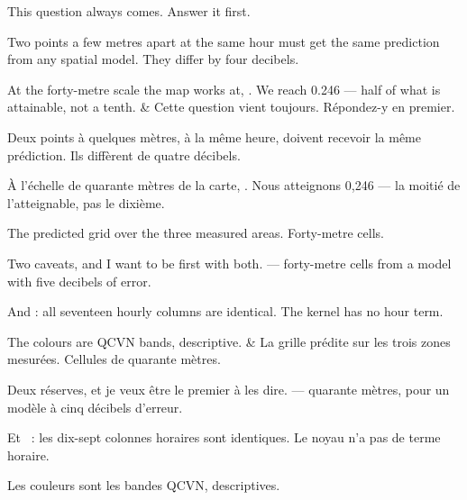 \documentclass[10pt,a4paper]{article}
\begin{document}
\begin{say}
This question always comes. Answer it first.

Two points a few metres apart at the same hour must get the same prediction from
any spatial model.  They differ by four decibels.

At the forty-metre scale the map works at, . We
reach 0.246 --- half of what is attainable, not a tenth.
&
Cette question vient toujours. Répondez-y en premier.

Deux points à quelques mètres, à la même heure, doivent recevoir la même
prédiction.  Ils diffèrent de quatre décibels.

À l'échelle de quarante mètres de la carte, .
Nous atteignons 0,246 --- la moitié de l'atteignable, pas le dixième.
\end{say}

\begin{say}
The predicted grid over the three measured areas. Forty-metre cells.

Two caveats, and I want to be first with both.  --- forty-metre cells from a model with five decibels of error.

And : all seventeen hourly columns are identical. The
kernel has no hour term.

The colours are QCVN bands, descriptive. 
&
La grille prédite sur les trois zones mesurées. Cellules de quarante mètres.

Deux réserves, et je veux être le premier à les dire.  --- quarante mètres, pour un modèle à cinq décibels
d'erreur.

Et ~: les dix-sept colonnes horaires sont identiques.
Le noyau n'a pas de terme horaire.

Les couleurs sont les bandes QCVN, descriptives. 
\end{say}
\end{document}
